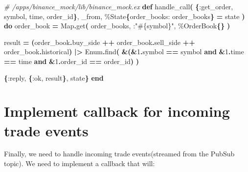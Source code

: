 \documentclass[
  oneside]{book}
\newenvironment{Shaded}{\begin{snugshade}}{\end{snugshade}}
\newcommand{\CommentTok}[1]{\textcolor[rgb]{0.56,0.35,0.01}{\textit{#1}}}
\newcommand{\ConstantTok}[1]{\textcolor[rgb]{0.56,0.35,0.01}{#1}}
\newcommand{\DecValTok}[1]{\textcolor[rgb]{0.00,0.00,0.81}{#1}}
\newcommand{\FunctionTok}[1]{\textcolor[rgb]{0.13,0.29,0.53}{\textbf{#1}}}
\newcommand{\KeywordTok}[1]{\textcolor[rgb]{0.13,0.29,0.53}{\textbf{#1}}}
\newcommand{\NormalTok}[1]{#1}
\newcommand{\OperatorTok}[1]{\textcolor[rgb]{0.81,0.36,0.00}{\textbf{#1}}}
\newcommand{\OtherTok}[1]{\textcolor[rgb]{0.56,0.35,0.01}{#1}}
\newcommand{\StringTok}[1]{\textcolor[rgb]{0.31,0.60,0.02}{#1}}
\newcommand{\VariableTok}[1]{\textcolor[rgb]{0.00,0.00,0.00}{#1}}
\begin{document}
\begin{Shaded}
\begin{Highlighting}[]
\CommentTok{\# /apps/binance\_mock/lib/binance\_mock.ex}
  \KeywordTok{def}\NormalTok{ handle\_call}\FunctionTok{(}
        \FunctionTok{\{}\VariableTok{:get\_order}\NormalTok{, symbol, time, order\_id}\FunctionTok{\}}\NormalTok{,}
\NormalTok{        \_from,}
\NormalTok{        \%}\ConstantTok{State}\FunctionTok{\{}\VariableTok{order\_books:}\NormalTok{ order\_books}\FunctionTok{\}} \OperatorTok{=}\NormalTok{ state}
      \FunctionTok{)} \KeywordTok{do}
\NormalTok{    order\_book }\OperatorTok{=}
      \ConstantTok{Map}\OperatorTok{.}\NormalTok{get}\FunctionTok{(}
\NormalTok{        order\_books,}
\NormalTok{        :}\StringTok{"}\OtherTok{\#\{}\NormalTok{symbol}\OtherTok{\}}\StringTok{"}\NormalTok{,}
\NormalTok{        \%}\ConstantTok{OrderBook}\FunctionTok{\{\}}
      \FunctionTok{)}

\NormalTok{    result }\OperatorTok{=}
      \FunctionTok{(}\NormalTok{order\_book}\OperatorTok{.}\NormalTok{buy\_side }\OperatorTok{++}
\NormalTok{         order\_book}\OperatorTok{.}\NormalTok{sell\_side }\OperatorTok{++}
\NormalTok{         order\_book}\OperatorTok{.}\NormalTok{historical}\FunctionTok{)}
      \OperatorTok{|\textgreater{}} \ConstantTok{Enum}\OperatorTok{.}\NormalTok{find}\FunctionTok{(}
        \OperatorTok{\&}\FunctionTok{(}\OperatorTok{\&}\DecValTok{1}\OperatorTok{.}\NormalTok{symbol }\OperatorTok{==}\NormalTok{ symbol }\KeywordTok{and}
            \OperatorTok{\&}\DecValTok{1}\OperatorTok{.}\NormalTok{time }\OperatorTok{==}\NormalTok{ time }\KeywordTok{and}
            \OperatorTok{\&}\DecValTok{1}\OperatorTok{.}\NormalTok{order\_id }\OperatorTok{==}\NormalTok{ order\_id}\FunctionTok{)}
      \FunctionTok{)}

    \FunctionTok{\{}\VariableTok{:reply}\NormalTok{, }\FunctionTok{\{}\VariableTok{:ok}\NormalTok{, result}\FunctionTok{\}}\NormalTok{, state}\FunctionTok{\}}
  \KeywordTok{end}
\end{Highlighting}
\end{Shaded}

\section{Implement callback for incoming trade events}\label{implement-callback-for-incoming-trade-events}

Finally, we need to handle incoming trade events(streamed from the PubSub topic). We need to implement a callback that will:
\end{document}
